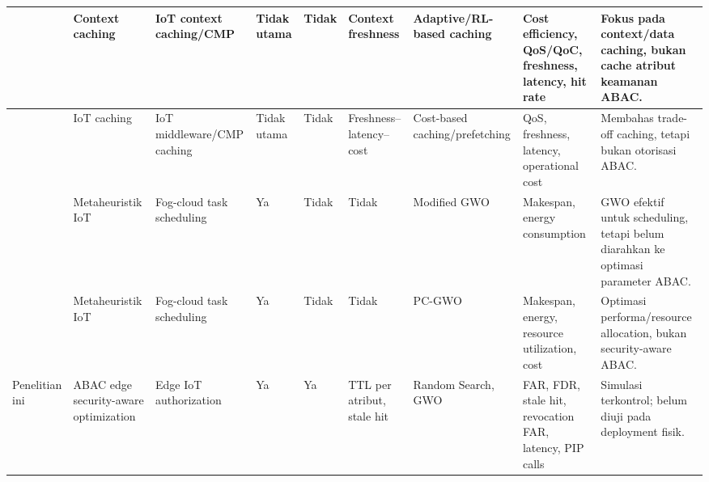 \begin{landscape}
\begin{table}[H]
\begin{tabularx}{\linewidth}{|
L{2.4cm}|
L{2.1cm}|
L{2.2cm}|
L{1.2cm}|
L{1.2cm}|
L{2.4cm}|
L{2.0cm}|
L{2.8cm}|
Y|}
\textcite{weerasinghe_adaptive_2023}
& Context caching
& IoT context caching/CMP
& Tidak utama
& Tidak
& Context freshness
& Adaptive/RL-based caching
& Cost efficiency, QoS/QoC, freshness, latency, hit rate
& Fokus pada context/data caching, bukan cache atribut keamanan ABAC. \\ \hline

\textcite{medvedev_refresh_2023}
& IoT caching
& IoT middleware/CMP caching
& Tidak utama
& Tidak
& Freshness--latency--cost
& Cost-based caching/prefetching
& QoS, freshness, latency, operational cost
& Membahas trade-off caching, tetapi bukan otorisasi ABAC. \\ \hline

\textcite{alsadie_modified_2025}
& Metaheuristik IoT
& Fog-cloud task scheduling
& Ya
& Tidak
& Tidak
& Modified GWO
& Makespan, energy consumption
& GWO efektif untuk scheduling, tetapi belum diarahkan ke optimasi parameter ABAC. \\ \hline

\textcite{alsamarai_improved_2024}
& Metaheuristik IoT
& Fog-cloud task scheduling
& Ya
& Tidak
& Tidak
& PC-GWO
& Makespan, energy, resource utilization, cost
& Optimasi performa/resource allocation, bukan security-aware ABAC. \\ \hline

Penelitian ini
& ABAC edge security-aware optimization
& Edge IoT authorization
& Ya
& Ya
& TTL per atribut, stale hit
& Random Search, GWO
& FAR, FDR, stale hit, revocation FAR, latency, PIP calls
& Simulasi terkontrol; belum diuji pada deployment fisik. \\ \hline

\end{tabularx}
\label{tab:related-work-abac-iot}
\end{table}
\end{landscape}